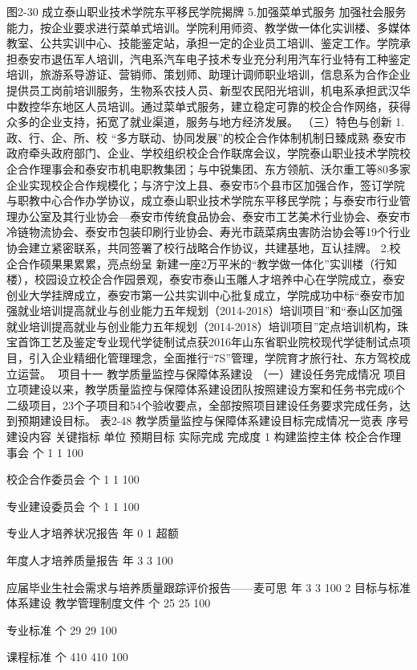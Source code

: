 图2-30 成立泰山职业技术学院东平移民学院揭牌
5.加强菜单式服务  
加强社会服务能力，按企业要求进行菜单式培训。学院利用师资、教学做一体化实训楼、多媒体教室、公共实训中心、技能鉴定站，承担一定的企业员工培训、鉴定工作。学院承担泰安市退伍军人培训，汽电系汽车电子技术专业充分利用汽车行业特有工种鉴定培训，旅游系导游证、营销师、策划师、助理计调师职业培训，信息系为合作企业提供员工岗前培训服务，生物系农技人员、新型农民阳光培训，机电系承担武汉华中数控华东地区人员培训。通过菜单式服务，建立稳定可靠的校企合作网络，获得众多的企业支持，拓宽了就业渠道，服务与地方经济发展。
（三）特色与创新
1.政、行、企、所、校 “多方联动、协同发展”的校企合作体制机制日臻成熟
泰安市政府牵头政府部门、企业、学校组织校企合作联席会议，学院泰山职业技术学院校企合作理事会和泰安市机电职教集团；与中锐集团、东方领航、沃尔重工等80多家企业实现校企合作规模化；与济宁汶上县、泰安市5个县市区加强合作，签订学院与职教中心合作办学协议，成立泰山职业技术学院东平移民学院；与泰安市行业管理办公室及其行业协会—泰安市传统食品协会、泰安市工艺美术行业协会、泰安市冷链物流协会、泰安市包装印刷行业协会、寿光市蔬菜病虫害防治协会等19个行业协会建立紧密联系，共同签署了校行战略合作协议，共建基地，互认挂牌。
2.校企合作硕果果累累，亮点纷呈  
新建一座2万平米的“教学做一体化”实训楼（行知楼），校园设立校企合作园景观，泰安市泰山玉雕人才培养中心在学院成立，泰安创业大学挂牌成立，泰安市第一公共实训中心批复成立，学院成功中标“泰安市加强就业培训提高就业与创业能力五年规划（2014-2018）培训项目”和“泰山区加强就业培训提高就业与创业能力五年规划（2014-2018）培训项目”定点培训机构，珠宝首饰工艺及鉴定专业现代学徒制试点获2016年山东省职业院校现代学徒制试点项目，引入企业精细化管理理念，全面推行“7S”管理，学院育才旅行社、东方驾校成立运营。
项目十一    教学质量监控与保障体系建设
（一）建设任务完成情况
项目立项建设以来，教学质量监控与保障体系建设团队按照建设方案和任务书完成6个二级项目，23个子项目和54个验收要点，全部按照项目建设任务要求完成任务，达到预期建设目标。
表2-48  教学质量监控与保障体系建设目标完成情况一览表
序号
建设内容
关键指标
单位
预期目标
实际完成
完成度
1
构建监控主体
校企合作理事会
个
1
1
100%


校企合作委员会
个
1
1
100%


专业建设委员会
个
1
1
100%


专业人才培养状况报告
年
0
1
超额


年度人才培养质量报告
年
3
3
100%


应届毕业生社会需求与培养质量跟踪评价报告——麦可思
年
3
3
100%
2
目标与标准体系建设
教学管理制度文件
个
25
25
100%


专业标准
个
29
29
100%


课程标准
个
410
410
100%


